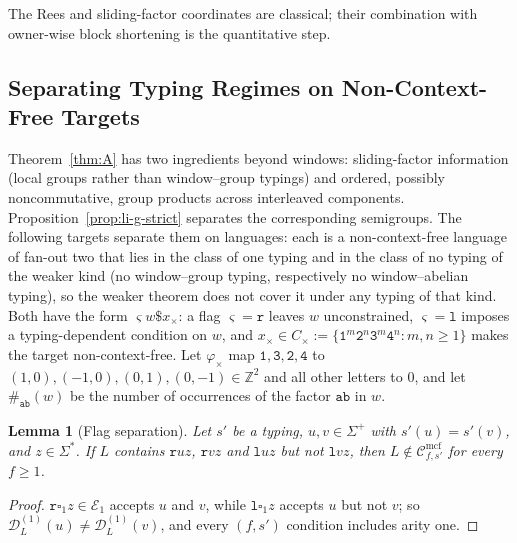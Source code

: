 \documentclass[11pt]{article}
\numberwithin{equation}{section}
\theoremstyle{plain}
\newtheorem{lemma}[theorem]{Lemma}
\theoremstyle{definition}
\theoremstyle{remark}
\newcommand{\Cmcf}[2]{\mathcal{C}^{\mathrm{mcf}}_{#1,#2}}
\newcommand{\D}{\mathcal{D}}
\newcommand{\blank}{\square}
\theoremstyle{plain}
\begin{document}
The Rees and sliding-factor coordinates are classical; their combination with
owner-wise block shortening is the quantitative step.

\subsection{Separating Typing Regimes on Non-Context-Free Targets}
\label{subsec:features-needed}
\label{subsec:necessity}

Theorem~\ref{thm:A} has two ingredients beyond windows: sliding-factor
information (local groups rather than window--group typings) and ordered,
possibly noncommutative, group products across interleaved components.
Proposition~\ref{prop:li-g-strict} separates the corresponding semigroups.  The
following targets separate them on languages: each is a non-context-free
language of fan-out two that lies in the class of one typing and in the class of
no typing of the weaker kind (no window--group typing, respectively no
window--abelian typing), so the weaker theorem does not cover it under any
typing of that kind.  Both have the form $\varsigma w\mathtt\$x_\times$: a flag
$\varsigma=\mathtt r$ leaves $w$ unconstrained, $\varsigma=\mathtt l$ imposes a
typing-dependent condition on $w$, and
$x_\times\in C_\times:=\{\mathtt{1}^m\mathtt{2}^n\mathtt{3}^m\mathtt{4}^n:m,n\ge1\}$
makes the target non-context-free.  Let $\varphi_\times$ map
$\mathtt 1,\mathtt 3,\mathtt 2,\mathtt 4$ to $(1,0),(-1,0),(0,1),(0,-1)\in\mathbb Z^2$
and all other letters to $0$, and let $\#_{\mathtt{ab}}(w)$ be the number of
occurrences of the factor $\mathtt{ab}$ in $w$.

\begin{lemma}[Flag separation]
\label{lem:flag-separation}
Let $s'$ be a typing, $u,v\in\Sigma^+$ with $s'(u)=s'(v)$, and $z\in\Sigma^*$.  If $L$
contains $\mathtt ruz$, $\mathtt rvz$ and $\mathtt luz$ but not $\mathtt lvz$, then
$L\notin\Cmcf{f}{s'}$ for every $f\ge1$.
\end{lemma}

\begin{proof}
$\mathtt r\blank_1z\in\mathcal E_1$ accepts $u$ and $v$, while $\mathtt l\blank_1z$
accepts $u$ but not $v$; so $\D^{(1)}_L(u)\ne\D^{(1)}_L(v)$, and every $(f,s')$
condition includes arity one.
\end{proof}
\end{document}
